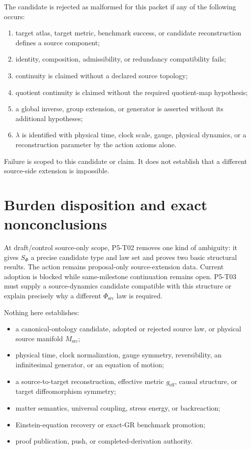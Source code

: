 \documentclass[11pt]{article}
\newcommand{\PhiSrc}{\Phi_{\mathrm{src}}}
\begin{document}
The candidate is rejected as malformed for this packet if any of the
following occurs:
\begin{enumerate}
  \item target atlas, target metric, benchmark success, or candidate
  reconstruction defines a source component;
  \item identity, composition, admissibility, or redundancy compatibility
  fails;
  \item continuity is claimed without a declared source topology;
  \item quotient continuity is claimed without the required quotient-map
  hypothesis;
  \item a global inverse, group extension, or generator is asserted without
  its additional hypotheses;
  \item \(\lambda\) is identified with physical time, clock scale, gauge,
  physical dynamics, or a reconstruction parameter by the action axioms
  alone.
\end{enumerate}
Failure is scoped to this candidate or claim. It does not establish that a
different source-side extension is impossible.

\section{Burden disposition and exact nonconclusions}

At draft/control source-only scope, P5-T02 removes one kind of ambiguity:
it gives \(S_\Phi\) a precise candidate type and law set and proves two basic
structural results. The action remains proposal-only source-extension data.
Current adoption is blocked while same-milestone continuation remains open.
P5-T03 must supply a source-dynamics candidate compatible with this structure
or explain precisely why a different \(\PhiSrc\) law is required.

Nothing here establishes:
\begin{itemize}
  \item a canonical-ontology candidate, adopted or rejected source law, or
  physical source manifold \(M_{\mathrm{src}}\);
  \item physical time, clock normalization, gauge symmetry, reversibility,
  an infinitesimal generator, or an equation of motion;
  \item a source-to-target reconstruction, effective metric
  \(g_{\mathrm{eff}}\), causal structure, or target diffeomorphism symmetry;
  \item matter semantics, universal coupling, stress energy, or backreaction;
  \item Einstein-equation recovery or exact-GR benchmark promotion;
  \item proof publication, push, or completed-derivation authority.
\end{itemize}
\end{document}
